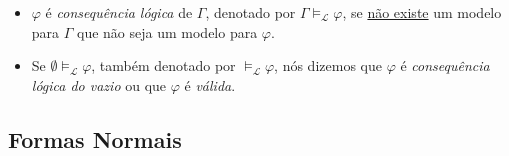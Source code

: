 \begin{itemize}[left=0.5cm, align=left, nosep]
            \item $\varphi$ é \textit{consequência lógica} de $\Gamma$, denotado por $\Gamma \vDash_{\mathcal{L}} \varphi$, se 
            \underline{não existe} um modelo para $\Gamma$ que não seja um modelo para $\varphi$.

            \item Se $\emptyset \vDash_{\mathcal{L}} \varphi$, também denotado por $\vDash_{\mathcal{L}} \varphi$, nós dizemos 
            que $\varphi$ é \textit{consequência lógica do vazio} ou que $\varphi$ é \textit{válida}.

        \end{itemize}

    \subsection{Formas Normais}

